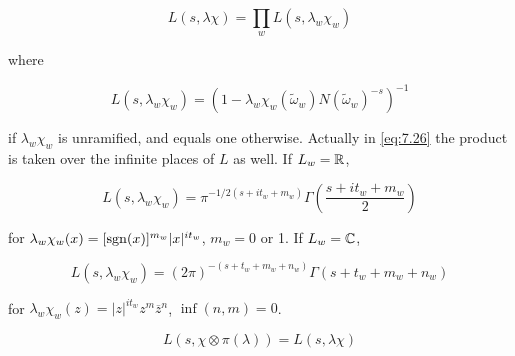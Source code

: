 \begin{equation}\label{eq:7.26}
L(s,\lambda\chi) = \prod_w L(s,\lambda_w\chi_w)\tag{7.26}
\end{equation}

where

\begin{equation}\label{eq:7.27}
L(s,\lambda_w\chi_w) = (1 - \lambda_w\chi_w(\tilde{\omega}_w)N(\tilde{\omega}_w)^{-s})^{-1}\tag{7.27}
\end{equation}

if $\lambda_w\chi_w$ is unramified, and equals one otherwise. Actually in \eqref{eq:7.26} the product is taken over the infinite places of $L$ as well. If $L_w = \mathbb{R}$,

\begin{equation}\label{eq:7.28}
L(s,\lambda_w\chi_w) = \pi^{-1/2(s + it_w + m_w)}\Gamma\left(\frac{s + it_w + m_w}{2}\right)\tag{7.28}
\end{equation}

for $\lambda_w\chi_w(x) = [\operatorname{sgn}(x)]^{m_w}|x|^{it_w}$, $m_w = 0$ or 1. If $L_w = \mathbb{C}$,

\begin{equation}\label{eq:7.29}
L(s,\lambda_w\chi_w) = (2\pi)^{-(s + t_w + m_w + n_w)}\Gamma(s + t_w + m_w + n_w)\tag{7.29}
\end{equation}

for $\lambda_w\chi_w(z) = |z|^{it_w}z^{m}\overline{z}^{n}$, $\inf(n,m) = 0$.

\begin{lemma}\label{lem:7.9}

\begin{equation}\label{eq:7.30}
L(s,\chi \otimes \pi(\lambda)) = L(s,\lambda\chi)\tag{7.30}
\end{equation}

\end{lemma}

